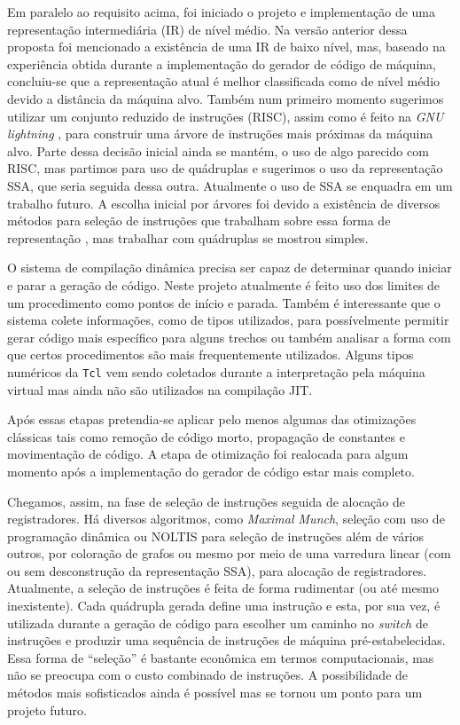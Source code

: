 Em paralelo ao requisito acima, foi iniciado o projeto e
implementação de uma representação intermediária (IR) de nível
médio. Na versão anterior dessa proposta foi mencionado a existência
de uma IR de baixo nível, mas, baseado na experiência obtida durante a
implementação do gerador de código de máquina, concluiu-se que a
representação atual é melhor classificada como de nível médio
devido a distância da máquina alvo. Também num primeiro momento
sugerimos utilizar um conjunto reduzido de instruções (RISC), assim
como é feito na \textit{GNU lightning} \cite{gnu_lightning}, para
construir uma árvore de instruções mais próximas da máquina
alvo. Parte dessa decisão inicial ainda se mantém, o uso de algo
parecido com RISC, mas partimos para uso de quádruplas e sugerimos o
uso da representação SSA, que seria seguida dessa outra. Atualmente o
uso de SSA se enquadra em um trabalho futuro.
A escolha inicial por árvores foi devido
a existência de diversos métodos para seleção de
instruções que trabalham sobre essa forma de representação
\cite{ir_tree_parsing}, mas trabalhar com quádruplas se mostrou
simples.

O sistema de compilação dinâmica precisa ser
capaz de determinar quando iniciar e parar a geração de código.
Neste projeto atualmente é feito uso dos
limites de um procedimento como pontos de início e parada. Também é
interessante que o sistema colete informações, como de tipos
utilizados, para possívelmente permitir gerar código mais específico
para alguns trechos ou também analisar a forma com que certos procedimentos
são mais frequentemente utilizados. Alguns tipos numéricos da
\texttt{Tcl} vem sendo coletados durante a interpretação pela máquina
virtual mas ainda não são utilizados na compilação JIT.

Após essas etapas pretendia-se aplicar pelo menos algumas das
otimizações clássicas tais como remoção de código morto, propagação de
constantes e movimentação de código. A etapa de otimização foi
realocada para algum momento após a implementação do gerador de código
estar mais completo.

Chegamos, assim, na fase de seleção de instruções
seguida de alocação de registradores. Há diversos algoritmos, como
\textit{Maximal Munch}, seleção com uso de programação dinâmica ou
NOLTIS \cite{noltis}  para seleção de instruções além de vários
outros, por coloração de grafos ou mesmo por meio de uma varredura
linear \cite{linear_scan_regalloc} (com ou sem \cite{wimmer_franz}
desconstrução da representação SSA), para alocação de registradores.
Atualmente, a seleção de instruções é feita de forma
rudimentar (ou até mesmo inexistente). Cada quádrupla gerada define uma
instrução e esta, por sua vez, é utilizada durante a geração de código
para escolher um caminho no \textit{switch} de instruções e produzir
uma sequência de instruções de máquina pré-estabelecidas. Essa forma
de ``seleção'' é bastante econômica em termos computacionais, mas não
se preocupa com o custo combinado de instruções. %
A possibilidade de métodos mais sofisticados ainda é
possível mas se tornou um ponto para um projeto futuro.

